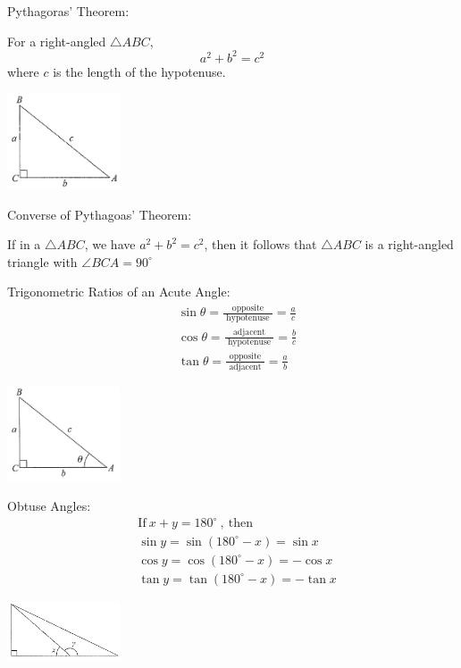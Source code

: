 \documentclass[twocolumn]{article}
\begin{document}
\noindent 
Pythagoras' Theorem:

\noindent 
For a right-angled $\triangle A B C$,
$$
a^2+b^2=c^2
$$
where $c$ is the length of the hypotenuse.

\includegraphics[width=0.25\textwidth]{100.png}

\bigskip 

\noindent 
Converse of Pythagoas' Theorem:

\noindent 
If in a  $\triangle A B C$, we have  $a^2+b^2=c^2$,
then it follows that $\triangle A B C$ is a right-angled triangle with $\angle BCA = 90^{\circ}$

\bigskip 

\noindent 
Trigonometric Ratios of an Acute Angle:
$$
\begin{aligned}
	& \sin \theta=\frac{\text { opposite }}{\text { hypotenuse }}=\frac{a}{c} \\
	& \cos \theta=\frac{\text { adjacent }}{\text { hypotenuse }}=\frac{b}{c} \\
	& \tan \theta=\frac{\text { opposite }}{\text { adjacent }}=\frac{a}{b}
\end{aligned}
$$

\includegraphics[width=0.25\textwidth]{101.png}

\bigskip 

\noindent 
Obtuse Angles:
$$
\begin{aligned}
	& \text{If} \ x+y=180^{\circ} \ , \ \text{then} \\
	& \sin y=\sin \left(180^{\circ}-x\right)=\sin x \\
	& \cos y=\cos \left(180^{\circ}-x\right)=-\cos x \\
	& \tan y=\tan \left(180^{\circ}-x\right)=-\tan x
\end{aligned}
$$

\includegraphics[width=0.25\textwidth]{103.png}
\end{document}
